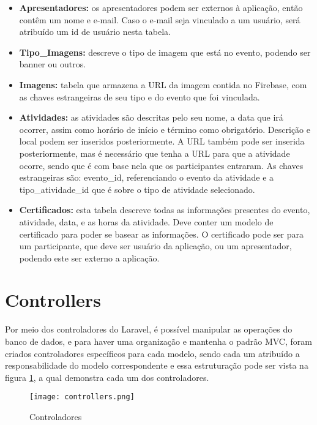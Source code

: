 \begin{itemize}
    \item \textbf{Apresentadores:} os apresentadores podem ser externos à aplicação, então contêm um nome e e-mail. Caso o e-mail seja vinculado a um usuário, será atribuído um id de usuário nesta tabela.
    
    \item \textbf{Tipo\_Imagens:} descreve o tipo de imagem que está no evento, podendo ser banner ou outros.
    
    \item \textbf{Imagens:} tabela que armazena a URL da imagem contida no Firebase, com as chaves estrangeiras de seu tipo e do evento que foi vinculada.
    
    \item \textbf{Atividades:} as atividades são descritas pelo seu nome, a data que irá ocorrer, assim como horário de início e término como obrigatório. Descrição e local podem ser inseridos posteriormente. A URL também pode ser inserida posteriormente, mas é necessário que tenha a URL para que a atividade ocorre, sendo que é com base nela que os participantes entraram. As chaves estrangeiras são: evento\_id, referenciando o evento da atividade e a tipo\_atividade\_id que é sobre o tipo de atividade selecionado.
    
    \item \textbf{Certificados:} esta tabela descreve todas as informações presentes do evento, atividade, data, e as horas da atividade. Deve conter um modelo de certificado para poder se basear as informações. O certificado pode ser para um participante, que deve ser usuário da aplicação, ou um apresentador, podendo este ser externo a aplicação.
    
\end{itemize}

\section{Controllers}
Por meio dos controladores do Laravel, é possível manipular as operações do banco de dados, e para haver uma organização e mantenha o padrão MVC, foram criados controladores específicos para cada modelo, sendo cada um atribuído a responsabilidade do modelo correspondente e essa estruturação pode ser vista na figura \ref{controllers}, a qual demonstra cada um dos controladores.
\begin{figure}[H]
    \caption{\label{controllers}Controladores}
    \vspace{5pt}
    \centering
    \texttt{[image: controllers.png]}
    \vspace{5pt}
\end{figure}

